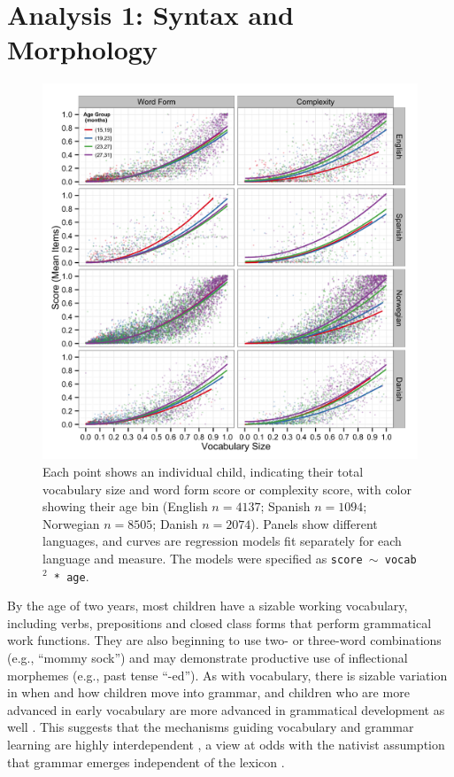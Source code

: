 \documentclass[10pt,letterpaper]{article}
\begin{document}
\section{Analysis 1: Syntax and Morphology}

\begin{figure}[t!]
\centering
\includegraphics[width=.75\textwidth]{plots/grammar.png}
\caption{\label{fig:grammar} Each point shows an individual child, indicating their total vocabulary size and word form score or complexity score, with color showing their age bin (English $n=4137$; Spanish $n=1094$; Norwegian $n=8505$; Danish $n=2074$). Panels show different languages, and curves are regression models fit separately for each language and measure. The models were specified as \small{\tt{score $\sim$ vocab$^{2}$ * age}}.} 
\end{figure}

By the age of two years, most children have a sizable working vocabulary, including verbs, prepositions and closed class forms that perform grammatical work functions. They are also beginning to use two- or three-word combinations (e.g., ``mommy sock'') and may demonstrate productive use of inflectional morphemes (e.g., past tense ``-ed''). As with vocabulary, there is sizable variation in when and how children move into grammar, and children who are more advanced in early vocabulary are more advanced in grammatical development as well \cite{bates1999}. This suggests that the mechanisms guiding vocabulary and grammar learning are highly interdependent \cite{tomasello2003,bresnan2001}, a view at odds with the nativist assumption that grammar emerges independent of the lexicon \cite{chomsky1981}.
\end{document}
